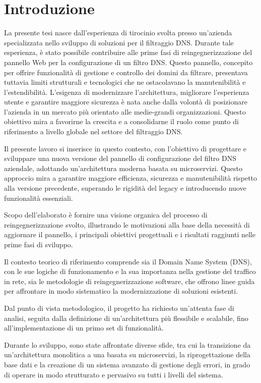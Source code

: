 \chapter{Introduzione}

La presente tesi nasce dall’esperienza di tirocinio svolta presso un’azienda specializzata nello sviluppo di soluzioni per il filtraggio DNS. Durante tale esperienza, è stato possibile contribuire alle prime fasi di reingegnerizzazione del pannello Web per la configurazione di un filtro DNS. Questo pannello, concepito per offrire funzionalità di gestione e controllo dei domini da filtrare, presentava tuttavia limiti strutturali e tecnologici che ne ostacolavano la manutenibilità e l’estendibilità. L’esigenza di modernizzare l’architettura, migliorare l’esperienza utente e garantire maggiore sicurezza è nata anche dalla volontà di posizionare l’azienda in un mercato più orientato alle medie-grandi organizzazioni. Questo obiettivo mira a favorirne la crescita e a consolidarne il ruolo come punto di riferimento a livello globale nel settore del filtraggio DNS.

Il presente lavoro si inserisce in questo contesto, con l’obiettivo di progettare e sviluppare una nuova versione del pannello di configurazione del filtro DNS aziendale, adottando un’architettura moderna basata su microservizi. Questo approccio mira a garantire maggiore efficienza, sicurezza e manutenibilità rispetto alla versione precedente, superando le rigidità del legacy e introducendo nuove funzionalità essenziali.

Scopo dell’elaborato è fornire una visione organica del processo di reingegnerizzazione svolto, illustrando le motivazioni alla base della necessità di aggiornare il pannello, i principali obiettivi progettuali e i risultati raggiunti nelle prime fasi di sviluppo.

Il contesto teorico di riferimento comprende sia il Domain Name System (DNS), con le sue logiche di funzionamento e la sua importanza nella gestione del traffico in rete, sia le metodologie di reingegnerizzazione software, che offrono linee guida per affrontare in modo sistematico la modernizzazione di soluzioni esistenti.

Dal punto di vista metodologico, il progetto ha richiesto un'attenta fase di analisi, seguita dalla definizione di un’architettura più flessibile e scalabile, fino all’implementazione di un primo set di funzionalità.

Durante lo sviluppo, sono state affrontate diverse sfide, tra cui la transizione da un’architettura monolitica a una basata su microservizi, la riprogettazione della base dati e la creazione di un sistema avanzato di gestione degli errori, in grado di operare in modo strutturato e pervasivo su tutti i livelli del sistema.

